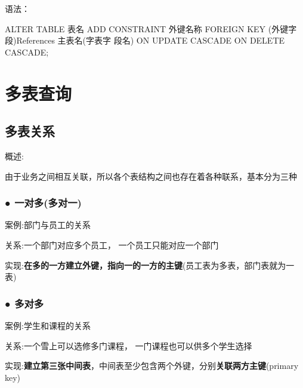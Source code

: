 \documentclass[
  letterpaper,
  DIV=11,
  numbers=noendperiod]{scrreprt}
\newenvironment{Shaded}{\begin{snugshade}}{\end{snugshade}}
\newcommand{\KeywordTok}[1]{\textcolor[rgb]{0.00,0.23,0.31}{#1}}
\newcommand{\NormalTok}[1]{\textcolor[rgb]{0.00,0.23,0.31}{#1}}
\begin{document}
语法：

\begin{Shaded}
\begin{Highlighting}[]
\KeywordTok{ALTER} \KeywordTok{TABLE}\NormalTok{ 表名 }\KeywordTok{ADD} \KeywordTok{CONSTRAINT}\NormalTok{ 外键名称 }\KeywordTok{FOREIGN} \KeywordTok{KEY}\NormalTok{ (外键字段)}\KeywordTok{References}\NormalTok{ 主表名(字表字 段名) }\KeywordTok{ON} \KeywordTok{UPDATE} \KeywordTok{CASCADE} \KeywordTok{ON} \KeywordTok{DELETE} \KeywordTok{CASCADE}\NormalTok{;}
\end{Highlighting}
\end{Shaded}

\hypertarget{ux591aux8868ux67e5ux8be2}{%
\section{多表查询}\label{ux591aux8868ux67e5ux8be2}}

\hypertarget{ux591aux8868ux5173ux7cfb}{%
\subsection{多表关系}\label{ux591aux8868ux5173ux7cfb}}

概述:

由于业务之间相互关联，所以各个表结构之间也存在着各种联系，基本分为三种

\hypertarget{ux4e00ux5bf9ux591aux591aux5bf9ux4e00}{%
\subsubsection{●
一对多(多对一)}\label{ux4e00ux5bf9ux591aux591aux5bf9ux4e00}}

案例:部门与员工的关系

关系:一个部门对应多个员工， 一个员工只能对应一个部门

实现:\textbf{在多的一方建立外键，指向一的一方的主键}(员工表为多表，部门表就为一表)

\hypertarget{ux591aux5bf9ux591a}{%
\subsubsection{\texorpdfstring{\textbf{●
多对多}}{● 多对多}}\label{ux591aux5bf9ux591a}}

案例:学生和课程的关系

关系:一个雪上可以选修多门课程， 一门课程也可以供多个学生选择

实现:\textbf{建立第三张中间表}，中间表至少包含两个外键，分别\textbf{关联两方主键}(primary
key)
\end{document}
